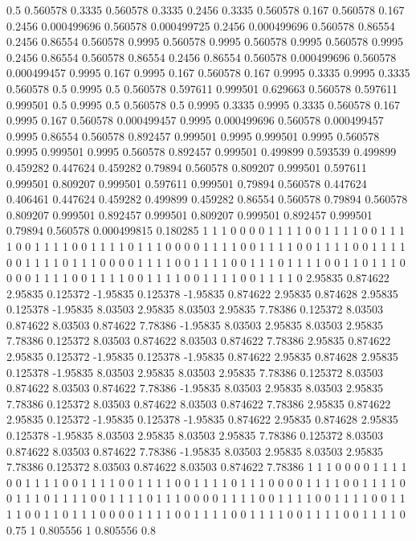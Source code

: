 0.5 0.560578
0.3335 0.560578
0.3335 0.2456
0.3335 0.560578
0.167 0.560578
0.167 0.2456
0.000499696 0.560578
0.000499725 0.2456
0.000499696 0.560578
0.86554 0.2456
0.86554 0.560578
0.9995 0.560578
0.9995 0.560578
0.9995 0.560578
0.9995 0.2456
0.86554 0.560578
0.86554 0.2456
0.86554 0.560578
0.000499696 0.560578
0.000499457 0.9995
0.167 0.9995
0.167 0.560578
0.167 0.9995
0.3335 0.9995
0.3335 0.560578
0.5 0.9995
0.5 0.560578
0.597611 0.999501
0.629663 0.560578
0.597611 0.999501
0.5 0.9995
0.5 0.560578
0.5 0.9995
0.3335 0.9995
0.3335 0.560578
0.167 0.9995
0.167 0.560578
0.000499457 0.9995
0.000499696 0.560578
0.000499457 0.9995
0.86554 0.560578
0.892457 0.999501
0.9995 0.999501
0.9995 0.560578
0.9995 0.999501
0.9995 0.560578
0.892457 0.999501
0.499899 0.593539
0.499899 0.459282
0.447624 0.459282
0.79894 0.560578
0.809207 0.999501
0.597611 0.999501
0.809207 0.999501
0.597611 0.999501
0.79894 0.560578
0.447624 0.406461
0.447624 0.459282
0.499899 0.459282
0.86554 0.560578
0.79894 0.560578
0.809207 0.999501
0.892457 0.999501
0.809207 0.999501
0.892457 0.999501
0.79894 0.560578
0.000499815 0.180285
1 1
1 0
0 0
0 1
1 1
1 0
0 1
1 1
1 0
0 1
1 1
1 0
0 1
1 1
1 0
0 1
1 1
1 0
1 1
1 0
0 0
0 1
1 1
1 0
0 1
1 1
1 0
0 1
1 1
1 0
0 1
1 1
1 0
0 1
1 1
1 0
1 1
1 0
0 0
0 1
1 1
1 0
0 1
1 1
1 0
0 1
1 1
0 1
1 1
1 0
0 1
1 0
1 1
1 0
0 0
0 1
1 1
1 0
0 1
1 1
1 0
0 1
1 1
1 0
0 1
1 1
1 0
0 1
1 1
1 0
2.95835 0.874622
2.95835 0.125372
-1.95835 0.125378
-1.95835 0.874622
2.95835 0.874628
2.95835 0.125378
-1.95835 8.03503
2.95835 8.03503
2.95835 7.78386
0.125372 8.03503
0.874622 8.03503
0.874622 7.78386
-1.95835 8.03503
2.95835 8.03503
2.95835 7.78386
0.125372 8.03503
0.874622 8.03503
0.874622 7.78386
2.95835 0.874622
2.95835 0.125372
-1.95835 0.125378
-1.95835 0.874622
2.95835 0.874628
2.95835 0.125378
-1.95835 8.03503
2.95835 8.03503
2.95835 7.78386
0.125372 8.03503
0.874622 8.03503
0.874622 7.78386
-1.95835 8.03503
2.95835 8.03503
2.95835 7.78386
0.125372 8.03503
0.874622 8.03503
0.874622 7.78386
2.95835 0.874622
2.95835 0.125372
-1.95835 0.125378
-1.95835 0.874622
2.95835 0.874628
2.95835 0.125378
-1.95835 8.03503
2.95835 8.03503
2.95835 7.78386
0.125372 8.03503
0.874622 8.03503
0.874622 7.78386
-1.95835 8.03503
2.95835 8.03503
2.95835 7.78386
0.125372 8.03503
0.874622 8.03503
0.874622 7.78386
1 1
1 0
0 0
0 1
1 1
1 0
0 1
1 1
1 0
0 1
1 1
1 0
0 1
1 1
1 0
0 1
1 1
1 0
1 1
1 0
0 0
0 1
1 1
1 0
0 1
1 1
1 0
0 1
1 1
0 1
1 1
1 0
0 1
1 1
1 0
1 1
1 0
0 0
0 1
1 1
1 0
0 1
1 1
1 0
0 1
1 1
1 0
0 1
1 1
1 0
0 1
1 0
1 1
1 0
0 0
0 1
1 1
1 0
0 1
1 1
1 0
0 1
1 1
1 0
0 1
1 1
1 0
0 1
1 1
1 0
0.75 1
0.805556 1
0.805556 0.8
